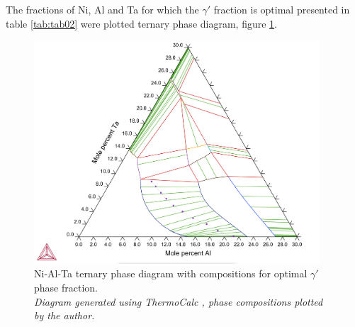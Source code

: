 The fractions of Ni, Al and Ta for which the $\gamma'$ fraction is optimal presented in table \ref{tab:tab02} were plotted ternary phase diagram, figure \ref{fig:diagram03}.

\begin{figure}[h]
  \centering
  \includegraphics[width=0.95\textwidth]{graficas/Q2_NiAlTa_ternary03.png}
  \caption{\centering Ni-Al-Ta ternary phase diagram with compositions for optimal $\gamma'$ phase fraction. \\
  \textit{Diagram generated using \textit{ThermoCalc} \citep{thermocalc}, phase compositions plotted by the author.}}
  \label{fig:diagram03}
\end{figure}